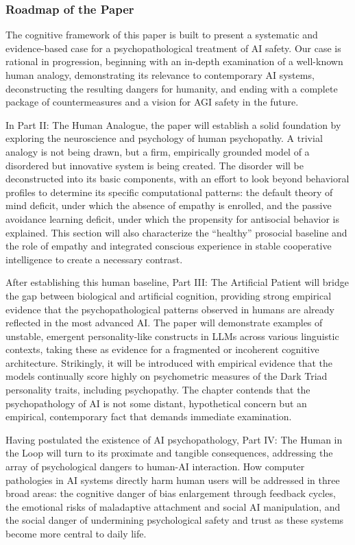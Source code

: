 \documentclass{article}
\begin{document}
\subsubsection{Roadmap of the Paper}
The cognitive framework of this paper is built to present a systematic and evidence-based case for a psychopathological treatment of AI safety. Our case is rational in progression, beginning with an in-depth examination of a well-known human analogy, demonstrating its relevance to contemporary AI systems, deconstructing the resulting dangers for humanity, and ending with a complete package of countermeasures and a vision for AGI safety in the future.

In Part II: The Human Analogue, the paper will establish a solid foundation by exploring the neuroscience and psychology of human psychopathy. A trivial analogy is not being drawn, but a firm, empirically grounded model of a disordered but innovative system is being created. The disorder will be deconstructed into its basic components, with an effort to look beyond behavioral profiles to determine its specific computational patterns: the default theory of mind deficit, under which the absence of empathy is enrolled, and the passive avoidance learning deficit, under which the propensity for antisocial behavior is explained. This section will also characterize the “healthy” prosocial baseline and the role of empathy and integrated conscious experience in stable cooperative intelligence to create a necessary contrast.

After establishing this human baseline, Part III: The Artificial Patient will bridge the gap between biological and artificial cognition, providing strong empirical evidence that the psychopathological patterns observed in humans are already reflected in the most advanced AI. The paper will demonstrate examples of unstable, emergent personality-like constructs in LLMs across various linguistic contexts, taking these as evidence for a fragmented or incoherent cognitive architecture. Strikingly, it will be introduced with empirical evidence that the models continually score highly on psychometric measures of the Dark Triad personality traits, including psychopathy. The chapter contends that the psychopathology of AI is not some distant, hypothetical concern but an empirical, contemporary fact that demands immediate examination.

Having postulated the existence of AI psychopathology, Part IV: The Human in the Loop will turn to its proximate and tangible consequences, addressing the array of psychological dangers to human-AI interaction. How computer pathologies in AI systems directly harm human users will be addressed in three broad areas: the cognitive danger of bias enlargement through feedback cycles, the emotional risks of maladaptive attachment and social AI manipulation, and the social danger of undermining psychological safety and trust as these systems become more central to daily life.
\end{document}
